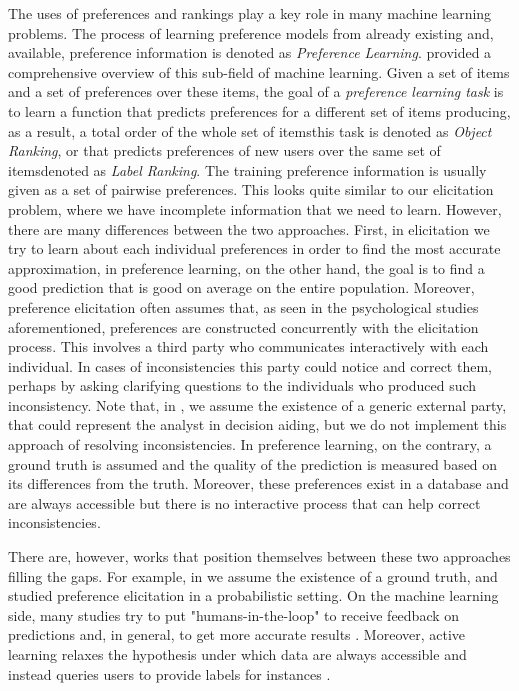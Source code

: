 The uses of preferences and rankings play a key role in many machine learning problems. The process of learning preference models from already existing and, available, preference information is denoted as \textit{Preference Learning}. \citet{Furnkranz2010} provided a comprehensive overview of this sub-field of machine learning.
Given a set of items and a set of preferences over these items, the goal of a \textit{preference learning task} is to learn a function that predicts preferences for a different set of items producing, as a result, a total order of the whole set of items\textemdash this task is denoted as \textit{Object Ranking}\textemdash, or that predicts preferences of new users over the same set of items\textemdash denoted as \textit{Label Ranking}.
The training preference information is usually given as a set of pairwise preferences.
This looks quite similar to our elicitation problem, where we have incomplete information that we need to learn. However, there are many differences between the two approaches.
First, in elicitation we try to learn about each individual preferences in order to find the most accurate approximation, in preference learning, on the other hand, the goal is to find a good prediction that is good on average on the entire population. Moreover, preference elicitation often assumes that, as seen in the psychological studies aforementioned, preferences are constructed concurrently with the elicitation process. This involves a third party who communicates interactively with each individual. In cases of inconsistencies this party could notice and correct them, perhaps by asking clarifying questions to the individuals who produced such inconsistency. 
Note that, in , we assume the existence of a generic external party, that could represent the analyst in decision aiding, but we do not implement this approach of resolving inconsistencies.
In preference learning, on the contrary, a ground truth is assumed and the quality of the prediction is measured based on its differences from the truth. Moreover, these preferences exist in a database and are always accessible but there is no interactive process that can help correct inconsistencies.

There are, however, works that position themselves between these two approaches filling the gaps. For example, in  we assume the existence of a ground truth, and \citet{Bachrach2010,Lu2011Prob} studied preference elicitation in a probabilistic setting. On the machine learning side, many studies try to put "humans-in-the-loop" to receive feedback on predictions and, in general, to get more accurate results \citep{Wu2022}. Moreover, active learning relaxes the hypothesis under which data are always accessible and instead queries users to provide labels for instances \citep{Settles2009}.




